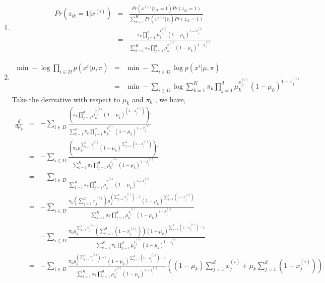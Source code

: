 \documentclass[12pt]{article}
\begin{document}
\begin{enumerate}
    \item \begin{eqnarray}
        Pr(z_{ik} = 1 | x^{(i)}) &=& \frac{Pr(x^{(i)}|z_{ik} = 1) Pr(z_{ik} = 1)}{\sum_{k=1}^K Pr(x^{(i)}| z_i) Pr(z_{ik} = 1)} \nonumber\\
        &=& \frac{\pi_k \prod_{j=1}^d \mu_{k}^{x^{(i)}_j} (1-\mu_k)^{1-x^{(i)}_j}}{\sum_{k=1}^K \pi_k \prod_{j=1}^d \mu_{k}^{x^{(i)}_j} (1-\mu_k)^{1-x^{(i)}_j}} \nonumber
    \end{eqnarray}
    \item \begin{eqnarray}
        \min -\log \prod_{i \in D} p(x^{i} | \mu, \pi) & = & \min -\sum_{i \in D} \log p(x^{i} | \mu, \pi) \nonumber\\
        & = & \min -\sum_{i \in D} \log \sum_{k=1}^K \pi_k \prod_{j=1}^d \mu_{k}^{x^{(i)}_j} (1-\mu_k)^{1-x^{(i)}_j} \nonumber
    \end{eqnarray}
    Take the derivative with respect to $\mu_k$ and $\pi_k$ , we have,
    \begin{eqnarray}
        \frac{d}{d \mu_k} &=& -\sum_{i \in D} \frac{( \pi_k \prod_{j=1}^{d} \mu_k ^{x_j^{(i)}} (1-\mu_k)^{(1 - x_j^{(i)})} )'}{ \sum_{k=1}^K \pi_k \prod_{j=1}^d \mu_{k}^{x^{(i)}_j} (1-\mu_k)^{1-x^{(i)}_j} } \nonumber
        \\ &=& -\sum_{i \in D} \frac{( \pi_k \mu_k ^{ \sum_{j=1}^{d} x_j^{(i)} } (1-\mu_k)^{ \sum_{j=1}^{d} (1 - x_j^{(i)})} )'}{ \sum_{k=1}^K \pi_k \prod_{j=1}^d \mu_{k}^{x^{(i)}_j} (1-\mu_k)^{1-x^{(i)}_j} } \nonumber
        \\ &=& -\sum_{i \in D} \frac{}{ \sum_{k=1}^K \pi_k \prod_{j=1}^d \mu_{k}^{x^{(i)}_j} (1-\mu_k)^{1-x^{(i)}_j} } \nonumber
        \\ &=& -\sum_{i \in D} \frac{ \pi_k (\sum_{j=1}^{d} x_j^{(i)}) \mu_k ^{ (\sum_{j=1}^{d} x_j^{(i)}) -1 } (1-\mu_k)^{ \sum_{j=1}^{d} (1 - x_j^{(i)})}}{ \sum_{k=1}^K \pi_k \prod_{j=1}^d \mu_{k}^{x^{(i)}_j} (1-\mu_k)^{1-x^{(i)}_j} } \nonumber
        \\ & & -\sum_{i \in D} \frac{ \pi_k \mu_k ^{ \sum_{j=1}^{d} x_j^{(i)} }(\sum_{j=1}^{d} (1 - x_j^{(i)})) (1-\mu_k)^{ \sum_{j=1}^{d} (1 - x_j^{(i)})-1}}{ \sum_{k=1}^K \pi_k \prod_{j=1}^d \mu_{k}^{x^{(i)}_j} (1-\mu_k)^{1-x^{(i)}_j} } \nonumber
        \\ &=& -\sum_{i \in D} \frac{\pi_k \mu_k ^{ (\sum_{j=1}^{d} x_j^{(i)}) -1 } (1-\mu_k)^{ \sum_{j=1}^{d} (1 - x_j^{(i)})-1} }{\sum_{k=1}^K \pi_k \prod_{j=1}^d \mu_{k}^{x^{(i)}_j} (1-\mu_k)^{1-x^{(i)}_j} }((1-\mu_k)\sum_{j=1}^{d} x^{(i)}_j + \mu_k \sum_{j=1}^{d} (1 - x^{(i)}_j)) \nonumber

\end{eqnarray}
\end{enumerate}
\end{document}
